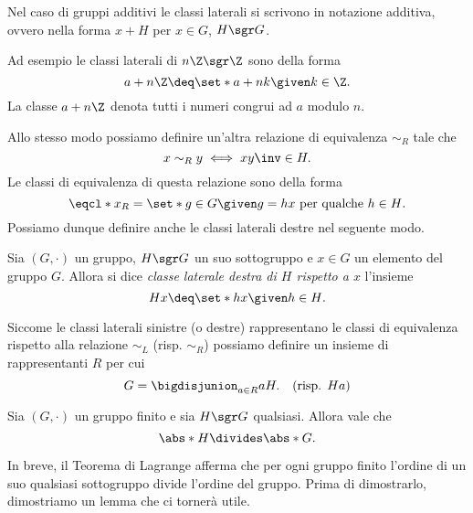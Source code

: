 \begin{remark}
    Nel caso di gruppi additivi le classi laterali si scrivono in notazione additiva, ovvero nella forma $x + H$ per $x \in G$, $H \sgr G$.
\end{remark}

\begin{example}
    Ad esempio le classi laterali di $n\Z \sgr \Z$ sono della forma \[
        a + n\Z \deq \set*{a + nk \given k \in \Z}.
    \] La classe $a + n\Z$ denota tutti i numeri congrui ad $a$ modulo $n$.
\end{example}

Allo stesso modo possiamo definire un'altra relazione di equivalenza $\sim_R$ tale che \[
    x \sim_R y \iff xy\inv \in H.    
\] Le classi di equivalenza di questa relazione sono della forma \[
    \eqcl*{x}_R = \set*{g \in G \given g = hx \text{ per qualche } h \in H}.    
\] Possiamo dunque definire anche le classi laterali destre nel seguente modo.
\begin{definition}
    Sia $(G, \cdot)$ un gruppo, $H \sgr G$ un suo sottogruppo e $x \in G$ un elemento del gruppo $G$.
    Allora si dice \emph{classe laterale destra di $H$ rispetto a $x$} l'insieme \[
        Hx \deq \set*{hx \given h \in H}. 
    \]
\end{definition}

\begin{remark}
    Siccome le classi laterali sinistre (o destre) rappresentano le classi di equivalenza rispetto alla relazione $\sim_L$ (risp. $\sim_R$) possiamo definire un insieme di rappresentanti $R$ per cui \begin{equation}
        G = \bigdisjunion_{a \in R} aH. \quad \text{(risp. $Ha$)}
    \end{equation}
\end{remark}

\begin{theorem}
     \label{th:lagrange}
    Sia $(G, \cdot)$ un gruppo finito e sia $H \sgr G$ qualsiasi. Allora vale che \[
        \abs*{H} \divides \abs*{G}.    
    \]
\end{theorem}

In breve, il Teorema di Lagrange afferma che per ogni gruppo finito l'ordine di un suo qualsiasi sottogruppo divide l'ordine del gruppo. Prima di dimostrarlo, dimostriamo un lemma che ci tornerà utile.

